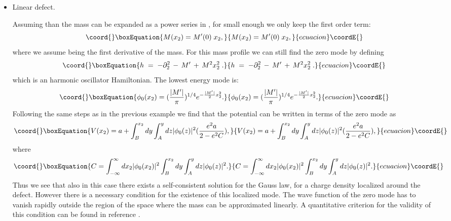 \documentclass[a4paper,12pt]{article}
\begin{document}
{{\begin{itemize}
\item Linear defect.
  
  Assuming than the mass can be expanded as a power series in \coordHE{},
  for small enough \coordHE{} we only keep the first order term:
\begin{equation}\coord{}\boxEquation{
M(x_2)=M'(0)\;x_2,
}{
M(x_2)=M'(0)\;x_2,
}{ecuacion}\coordE{}\end{equation}
where we assume \coordHE{} being \coordHE{} the first derivative of the
mass.  For this mass profile we can still find the zero mode by
defining~\cite{p1}
\begin{equation}\coord{}\boxEquation{
h\;=\;-\partial_2^2\,-\, M'\,+\,M^2 x_2^2\;.
}{
h\;=\;-\partial_2^2\,-\, M'\,+\,M^2 x_2^2\;.
}{ecuacion}\coordE{}\end{equation}
which is an harmonic oscillator Hamiltonian. The lowest energy mode
is:
\begin{equation}\coord{}\boxEquation{
\phi_0(x_2)=(\frac{|M'|}{\pi})^{1/4}e^{-\frac{|M'|}{2}x_2^2}.
}{
\phi_0(x_2)=(\frac{|M'|}{\pi})^{1/4}e^{-\frac{|M'|}{2}x_2^2}.
}{ecuacion}\coordE{}\end{equation}
Following the same steps as in the previous example we find that the
potential can be written in terms of the zero mode as
\begin{equation}\coord{}\boxEquation{
V(x_2)=a+\int_B^{x_2} dy \int_A^y dz |\phi_0(z)|^2(\frac{e^2a}{2-e^2C}),
}{
V(x_2)=a+\int_B^{x_2} dy \int_A^y dz |\phi_0(z)|^2(\frac{e^2a}{2-e^2C}),
}{ecuacion}\coordE{}\end{equation}
where
\begin{equation}\coord{}\boxEquation{
C=\int_{-\infty}^{\infty}dx_2 |\phi_0(x_2)|^2 \int_B^{x_2} dy \int_A^y dz |\phi_0(z)|^2.
}{
C=\int_{-\infty}^{\infty}dx_2 |\phi_0(x_2)|^2 \int_B^{x_2} dy \int_A^y dz |\phi_0(z)|^2.
}{ecuacion}\coordE{}\end{equation}
Thus we see that also in this case there exists a self-consistent
solution for the Gauss law, for a charge density localized around the
defect.  However there is a necessary condition for the existence of
this localized mode. The wave function of the zero mode has to vanish
rapidly outside the region of the space where the mass can be
approximated linearly. A quantitative criterion for the validity of
this condition can be found in reference \cite{p1}.

\end{itemize}

}}
\end{document}
